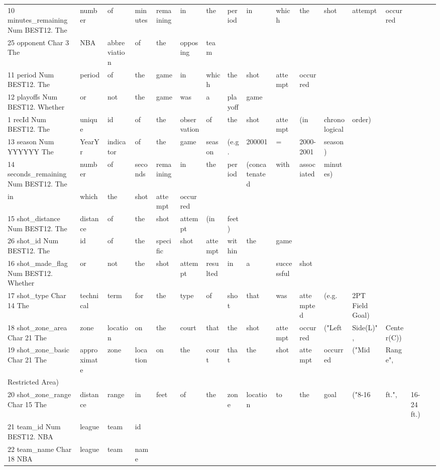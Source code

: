 {\begin{table}[h]
\begin{tabular}{llllllllllllllll}
    10	minutes\_remaining	Num	BEST12.	The & number & of & minutes & remaining & in & the & period & in & which & the & shot & attempt & occurred &  &  \\
    25	opponent	Char	3	The & NBA & abbreviation & of & the & opposing & team &  &  &  &  &  &  &  &  &  \\
    11	period	Num	BEST12.	The & period & of & the & game & in & which & the & shot & attempt & occurred &  &  &  &  &  \\
    12	playoffs	Num	BEST12.	Whether & or & not & the & game & was & a & playoff & game &  &  &  &  &  &  &  \\
    1	recId	Num	BEST12.	The & unique & id & of & the & observation & of & the & shot & attempt & (in & chronological & order) &  &  &  \\
    13	season	Num	YYYYYY	The & YearYr & indicator & of & the & game & season & (e.g. & 200001 & = & 2000-2001 & season) &  &  &  &  \\
    14	seconds\_remaining	Num	BEST12.	The & number & of & seconds & remaining & in & the & period & (concatenated & with & associated & minutes) &  &  &  &  \\
    in & which & the & shot & attempt & occurred &  &  &  &  &  &  &  &  &  &  \\
    15	shot\_distance	Num	BEST12.	The & distance & of & the & shot & attempt & (in & feet) &  &  &  &  &  &  &  &  \\
    26	shot\_id	Num	BEST12.	The & id & of & the & specific & shot & attempt & within & the & game &  &  &  &  &  &  \\
    16	shot\_made\_flag	Num	BEST12.	Whether & or & not & the & shot & attempt & resulted & in & a & successful & shot &  &  &  &  &  \\
    17	shot\_type	Char	14	The & technical & term & for & the & type & of & shot & that & was & attempted & (e.g. & 2PT Field Goal) &  &  &  \\
    18	shot\_zone\_area	Char	21	The & zone & location & on & the & court & that & the & shot & attempt & occurred & ("Left & Side(L)", & Center(C)) &  &  \\
    19	shot\_zone\_basic	Char	21	The & approximate & zone & location & on & the & court & that & the & shot & attempt & occurred & ("Mid & Range", &  &  \\
    Restricted Area) &  &  &  &  &  &  &  &  &  &  &  &  &  &  &  \\
    20	shot\_zone\_range	Char	15	The & distance & range & in & feet & of & the & zone & location & to & the & goal & ("8-16 & ft.", & 16-24 ft.) &  \\
    21	team\_id	Num	BEST12.	NBA & league & team & id &  &  &  &  &  &  &  &  &  &  &  &  \\
    22	team\_name	Char	18	NBA & league & team & name &  &  &  &  &  &  &  &  &  &  &  &
    \end{tabular}
    \end{table}
}
